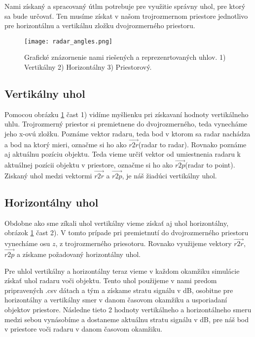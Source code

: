 \documentclass[slovak]{ExcelAtFIT} %
\begin{document}
    Nami získaný a spracovaný útlm potrebuje pre využitie správny uhol, pre ktorý sa bude určovať. Ten musíme získat v našom trojrozmernom priestore jednotlivo pre horizontálnu a vertikálnu zložku dvojroz\-merného priestoru.

	\begin{figure}[t]
		\centering
		\texttt{[image: radar\_angles.png]}
		\caption{Grafické znázornenie nami riešených a reprezenrtovaných uhlov. 1) Vertikálny 2) Horizontálny 3) Priestorový.}
		\label{fig:radar_angles}
	\end{figure}

    \subsection{Vertikálny uhol}

      Pomocou obrázku \ref{fig:radar_angles} čast 1) vidíme myšlienku pri získavaní hodnoty vertikálneho uhlu. Trojrozmerný priestor si premietnene do dvojrozmerného, teda vyne\-cháme jeho x-ovú zložku.
      Poz\-náme vektor radaru, teda bod v ktorom sa radar nachádza a bod na ktorý mieri, označme si ho ako $\overrightarrow{r2r}$(radar to radar).
      Rovnako poznáme aj aktuálnu pozíciu objektu. Teda vieme určiť vektor od umiestnenia radaru k aktuálnej pozícii objektu v priestore, označme si ho ako $\overrightarrow{r2p}$(radar to point).
      Ziskaný uhol medzi vektormi $\overrightarrow{r2r}$ a $\overrightarrow{r2p}$, je náš žiadúci vertikálny uhol. 

    \subsection{Horizontálny uhol}

    Obdobne ako sme zíkali uhol vertikálny vieme získať aj uhol horizontálny, obrázok \ref{fig:radar_angles} čast 2). V tomto prípade pri premietnutí do dvojrozmerného priestoru vynecháme osu $z$, z trojrozmerného priesotoru.
    Rovnako využijeme vektory $\overrightarrow{r2r}$, $\overrightarrow{r2p}$ a získame požadovaný horizontálny uhol.

    Pre uhlol vertikálny a horizontálny teraz vieme v každom okamžiku simulácie získať uhol radaru voči objektu. Tento uhol použijeme v nami predom pripra\-vených .csv dátach a tým a získame stratu signálu v dB, osobitne pre horizontálny a vertikálny smer v danom časovom okamžiku a usporiadaní objektov priestore. Následne tieto 2 hodnoty vertikálneho a horizontálneho smeru medzi sebou vynásobíme a dostaneme aktuálnu stratu signálu v dB, pre náš bod v priestore voči radaru v danom časovom okamžiku. 
  
\end{document}
